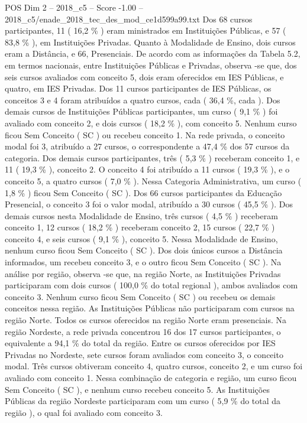 \begin{textsample}{POS Dim 2 – 2018\_c5 – Score -1.00 – 2018\_c5/enade\_2018\_tec\_des\_mod\_ce1d599a99.txt}
Dos 68 cursos participantes, 11 ( 16,2 \% ) eram ministrados em Instituições Públicas, e 57 ( 83,8 \% ), em Instituições Privadas.
Quanto à Modalidade de Ensino, dois cursos eram a Distância, e 66, Presenciais.
De acordo com as informações da Tabela 5.2, em termos nacionais, entre Instituições Públicas e Privadas, observa -se que, dos seis cursos avaliados com conceito 5, dois eram oferecidos em IES Públicas, e quatro, em IES Privadas.
Dos 11 cursos participantes de IES Públicas, os conceitos 3 e 4 foram atribuídos a quatro cursos, cada ( 36,4 \%, cada ).
Dos demais cursos de Instituições Públicas participantes, um curso ( 9,1 \% ) foi avaliado com conceito 2, e dois cursos ( 18,2 \% ), com conceito 5.
Nenhum curso ficou Sem Conceito ( SC ) ou recebeu conceito 1.
Na rede privada, o conceito modal foi 3, atribuído a 27 cursos, o correspondente a 47,4 \% dos 57 cursos da categoria.
Dos demais cursos participantes, três ( 5,3 \% ) receberam conceito 1, e 11 ( 19,3 \% ), conceito 2.
O conceito 4 foi atribuído a 11 cursos ( 19,3 \% ), e o conceito 5, a quatro cursos ( 7,0 \% ).
Nessa Categoria Administrativa, um curso ( 1,8 \% ) ficou Sem Conceito ( SC ).
Dos 66 cursos participantes da Educação Presencial, o conceito 3 foi o valor modal, atribuído a 30 cursos ( 45,5 \% ).
Dos demais cursos nesta Modalidade de Ensino, três cursos ( 4,5 \% ) receberam conceito 1, 12 cursos ( 18,2 \% ) receberam conceito 2, 15 cursos ( 22,7 \% ) conceito 4, e seis cursos ( 9,1 \% ), conceito 5.
Nessa Modalidade de Ensino, nenhum curso ficou Sem Conceito ( SC ).
Dos dois únicos cursos a Distância informados, um recebeu conceito 3, e o outro ficou Sem Conceito ( SC ).
Na análise por região, observa -se que, na região Norte, as Instituições Privadas participaram com dois cursos ( 100,0 \% do total regional ), ambos avaliados com conceito 3.
Nenhum curso ficou Sem Conceito ( SC ) ou recebeu os demais conceitos nessa região.
As Instituições Públicas não participaram com cursos na região Norte.
Todos os cursos oferecidos na região Norte eram presenciais.
Na região Nordeste, a rede privada concentrou 16 dos 17 cursos participantes, o equivalente a 94,1 \% do total da região.
Entre os cursos oferecidos por IES Privadas no Nordeste, sete cursos foram avaliados com conceito 3, o conceito modal.
Três cursos obtiveram conceito 4, quatro cursos, conceito 2, e um curso foi avaliado com conceito 1.
Nessa combinação de categoria e região, um curso ficou Sem Conceito ( SC ), e nenhum curso recebeu conceito 5.
As Instituições Públicas da região Nordeste participaram com um curso ( 5,9 \% do total da região ), o qual foi avaliado com conceito 3.

\end{textsample}
